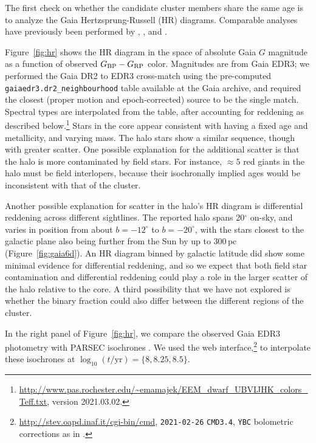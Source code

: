 \documentclass[12pt,twocolumn,tighten]{aastex63}
\newcommand{\bpmrp}{G_{\rm BP}-G_{\rm RP}}
\begin{document}
The first check on whether the candidate cluster members share the
same age is to analyze the Gaia Hertzsprung-Russell (HR) diagrams.
Comparable analyses have previously been performed by
,
, and .

Figure~\ref{fig:hr} shows the HR diagram in the space of absolute Gaia
$G$ magnitude as a function of observed $\bpmrp$ color.  Magnitudes
are from Gaia EDR3; we performed the Gaia DR2 to EDR3 cross-match
using the pre-computed \texttt{gaiaedr3.dr2\_neighbourhood} table
available at the Gaia archive, and required the closest (proper motion
and epoch-corrected) source to be the single match.  Spectral types
are interpolated from the \citet{pecaut_mamajek_2013} table, after
accounting for reddening as described
below.\footnote{\url{http://www.pas.rochester.edu/~emamajek/EEM_dwarf_UBVIJHK_colors_Teff.txt},
version 2021.03.02.} Stars in the core appear consistent with having a
fixed age and metallicity, and varying mass.  The halo stars show a
similar sequence, though with greater scatter.  One possible
explanation for the additional scatter is that the halo is more
contaminated by field stars.  For instance, $\approx5$ red giants in
the halo must be field interlopers, because their isochronally implied
ages would be inconsistent with that of the cluster.

Another possible explanation for scatter in the halo's HR diagram
is differential reddening across different sightlines.  The
reported halo spans 20$^\circ$ on-sky, and varies in position from
about $b=-12^\circ$ to $b=-20^\circ$, with the stars closest to the
galactic plane also being further from the Sun by up to 300\,pc
(Figure~\ref{fig:gaia6d}).  An HR diagram binned by galactic latitude
did show some minimal evidence for differential reddening, and so we
expect that both field star contamination and differential reddening
could play a role in the larger scatter of the halo relative to the
core.  A third possibility that we have not explored is whether the
binary fraction could also differ between the different regions of the
cluster.

In the right panel of Figure~\ref{fig:hr}, we compare the observed
Gaia EDR3 photometry with PARSEC isochrones
\citep{bressan_parsec_2012,chen_improving_2014,chen_parsec_2015,marigo_new_2017}.
We used the web
interface,\footnote{\url{http://stev.oapd.inaf.it/cgi-bin/cmd},
\texttt{2021-02-26} \texttt{CMD3.4}, \texttt{YBC} bolometric
corrections as in \citet{chen_2019_YBC}.} to interpolate these
isochrones at $\log_{10}(t/\mathrm{yr})=\{8, 8.25, 8.5\}$.
\end{document}
